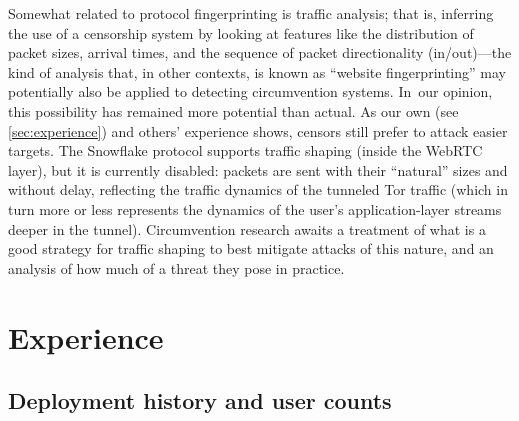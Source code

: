 \documentclass[letterpaper,twocolumn]{article}
\begin{document}
Somewhat related to protocol fingerprinting is traffic analysis;
that is, inferring the use of a censorship system
by looking at features like the distribution of packet sizes,
arrival times, and the sequence of packet directionality (in/out)---the
kind of analysis that, in other contexts, is known as ``website fingerprinting''
may potentially also be applied to detecting circumvention systems.
In~our opinion, this possibility has remained more potential than actual.
As our own (see \autoref{sec:experience}) and others' experience shows,
censors still prefer to attack easier targets.
The Snowflake protocol supports traffic shaping (inside the WebRTC layer),
but it is currently disabled:
packets are sent with their ``natural'' sizes and without delay,
reflecting the traffic dynamics of the tunneled Tor traffic
(which in turn more or less represents the dynamics
of the user's application-layer streams deeper in the tunnel).
Circumvention research awaits a treatment of
what is a good strategy for traffic shaping to
best mitigate attacks of this nature,
and an analysis of how much of a threat they pose in practice.

\section{Experience}
\label{sec:experience}


\subsection{Deployment history and user counts}
\label{sec:deployment}
\end{document}
